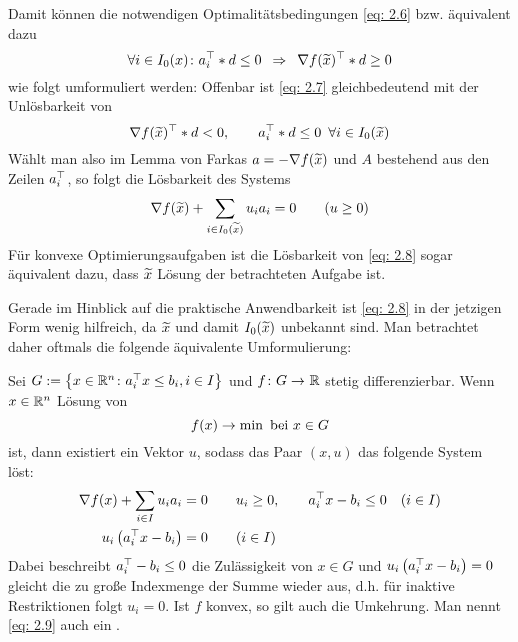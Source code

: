 Damit können die notwendigen Optimalitätsbedingungen \eqref{eq: 2.6} bzw. äquivalent dazu
\begin{equation}
	\forall i \in I_0(x) \colon a_i^{\top} * d \le 0 \enskip \Rightarrow \enskip \nabla f(\widetilde{x})^{\top} * d \ge 0 \label{eq: 2.7}
\end{equation}
wie folgt umformuliert werden: Offenbar ist \eqref{eq: 2.7} gleichbedeutend mit der Unlösbarkeit von 
\begin{equation*}
	\nabla f(\widetilde{x})^{\top} * d < 0, \qquad a_i^{\top} * d \le 0 \enskip \forall i \in I_0(\widetilde{x})
\end{equation*}
Wählt man also im Lemma von Farkas $a = - \nabla f(\widetilde{x})$ und $A$ bestehend aus den Zeilen $a_i^{\top}$, so folgt die Lösbarkeit des Systems
\begin{equation}
	\nabla f(\widetilde{x}) + \sum_{i \in I_0(\widetilde{x})} u_i a_i = 0 \qquad (u \ge 0) \label{eq: 2.8}
\end{equation}
Für konvexe Optimierungsaufgaben ist die Lösbarkeit von \eqref{eq: 2.8} sogar äquivalent dazu, dass $\widetilde{x}$ Lösung der betrachteten Aufgabe ist.

Gerade im Hinblick auf die praktische Anwendbarkeit ist \eqref{eq: 2.8} in der jetzigen Form wenig hilfreich, da $\widetilde{x}$ und damit $I_0(\widetilde{x})$ unbekannt sind. Man betrachtet daher oftmals die folgende äquivalente Umformulierung:

\begin{lemma} %
	\label{lemma: 2.8}
	Sei $G \mathrel{:=} \left\{ x \in \mathbb{R}^n \colon a_i^{\top}x \le b_i , i \in I \right\}$ und $\abb{f}{G}{\R}$ stetig differenzierbar. Wenn $x \in \mathbb{R}^n$ Lösung von
	\begin{equation*}
		f(x) \to \min \text{ bei } x \in  G
	\end{equation*}
	ist, dann existiert ein Vektor $u$, sodass das Paar $(x,u)$ das folgende System löst:
	\begin{align}
		\begin{split}
		\nabla f(x) + \sum_{i \in I} u_i a_i &= 0 \qquad u_i \ge 0 , \qquad a_i^{\top} x - b_i \le 0 \quad (i \in I) \\
		u_i \left( a_i^{\top}x - b_i \right) &= 0 \qquad (i \in I)
		\end{split} \label{eq: 2.9}
	\end{align}
	Dabei beschreibt $a_i^{\top} - b_i \le 0$ die Zulässigkeit von $x \in G$ und $u_i \left( a_i^{\top}x - b_i \right) = 0$ gleicht die zu große Indexmenge der Summe wieder aus, d.h. für inaktive Restriktionen folgt $u_i = 0$.
	Ist $f$ konvex, so gilt auch die Umkehrung. Man nennt \eqref{eq: 2.9} auch ein .
\end{lemma}

